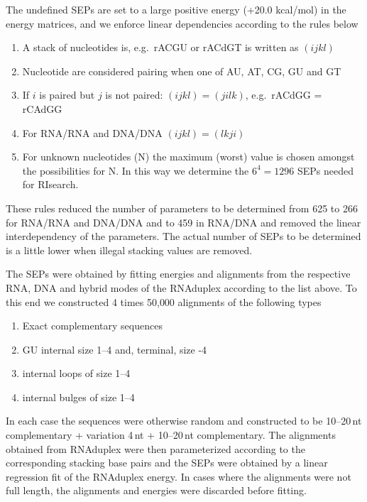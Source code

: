 \documentclass[11pt]{article}
\begin{document}
The undefined SEPs are set to a large positive energy (+20.0 kcal/mol) in the energy matrices, and we enforce linear dependencies according to the rules below

\begin{enumerate}
\item A stack of nucleotides is, e.g.\ rACGU or rACdGT is written as $(\mathit{ijkl})$

\item Nucleotide are considered pairing when one of AU, AT, CG, GU and GT

\item If $i$ is paired but $j$ is not paired: $(\mathit{ijkl}) = (\mathit{jilk})$, e.g.\ rACdGG = rCAdGG

\item For RNA/RNA and DNA/DNA $(\mathit{ijkl}) = (\mathit{lkji})$

\item For unknown nucleotides (N) the maximum (worst) value is chosen amongst the possibilities for N. In this way we determine the $6^4 = 1296$ SEPs needed for RIsearch.
\end{enumerate}

These rules reduced the number of parameters to be determined from 625 to 266 for RNA/RNA and DNA/DNA and to 459 in RNA/DNA and removed the linear interdependency of the parameters.
The actual number of SEPs to be determined is a little lower when illegal stacking values are removed.

The SEPs were obtained by fitting energies and alignments from the respective RNA, DNA and hybrid modes of the RNAduplex according to the list above.
To this end we constructed 4 times 50{,}000 alignments of the following types

\begin{enumerate}
\item Exact complementary sequences

\item GU internal size 1--4 and, terminal, size -4

\item internal loops of size 1--4

\item internal bulges of size 1--4
\end{enumerate}

In each case the sequences were otherwise random and constructed to be 10--20\,nt complementary + variation 4\,nt + 10--20\,nt complementary.
The alignments obtained from RNAduplex were then parameterized according to the corresponding stacking base pairs and the SEPs were obtained by a linear regression fit of the RNAduplex energy.
In cases where the alignments were not full length, the alignments and energies were discarded before fitting.
\end{document}
